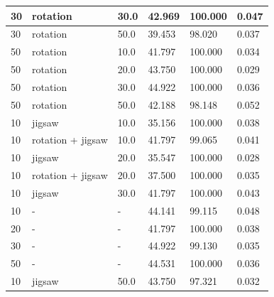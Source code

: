\begin{longtable}{|| p{} | p{} | p{} | p{} | p{} | p{} ||}
    30                & rotation          & 30.0           & 42.969                    & 100.000                & 0.047   \\ \hline
    30                & rotation          & 50.0           & 39.453                    & 98.020                 & 0.037   \\ \hline
    50                & rotation          & 10.0           & 41.797                    & 100.000                & 0.034   \\ \hline
    50                & rotation          & 20.0           & 43.750                    & 100.000                & 0.029   \\ \hline
    50                & rotation          & 30.0           & 44.922                    & 100.000                & 0.036   \\ \hline
    50                & rotation          & 50.0           & 42.188                    & 98.148                 & 0.052   \\ \hline
    10                & jigsaw            & 10.0           & 35.156                    & 100.000                & 0.038   \\ \hline
    10                & rotation + jigsaw & 10.0           & 41.797                    & 99.065                 & 0.041   \\ \hline
    10                & jigsaw            & 20.0           & 35.547                    & 100.000                & 0.028   \\ \hline
    10                & rotation + jigsaw & 20.0           & 37.500                    & 100.000                & 0.035   \\ \hline
    10                & jigsaw            & 30.0           & 41.797                    & 100.000                & 0.043   \\ \hline
    10                & -                 & -              & 44.141                    & 99.115                 & 0.048   \\ \hline
    20                & -                 & -              & 41.797                    & 100.000                & 0.038   \\ \hline
    30                & -                 & -              & 44.922                    & 99.130                 & 0.035   \\ \hline
    50                & -                 & -              & 44.531                    & 100.000                & 0.036   \\ \hline
    10                & jigsaw            & 50.0           & 43.750                    & 97.321                 & 0.032   \\ \hline

\end{longtable}
